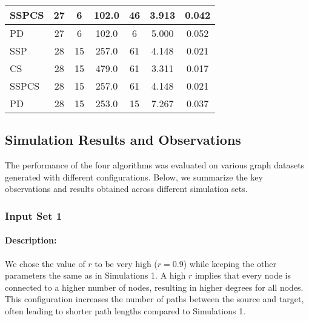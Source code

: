 \documentclass{article}
\begin{document}
\begin{table}[H]
{\begin{tabular}{|l|c|c|c|c|c|c|}
SSPCS              & 27             & 6                 & 102.0                  & 46             & 3.913                     & 0.042                                   \\ \hline
PD                 & 27             & 6                 & 102.0                  & 6              & 5.000                     & 0.052                                   \\ \hline
SSP                & 28             & 15                & 257.0                  & 61             & 4.148                     & 0.021                                   \\ \hline
CS                 & 28             & 15                & 479.0                  & 61             & 3.311                     & 0.017                                   \\ \hline
SSPCS              & 28             & 15                & 257.0                  & 61             & 4.148                     & 0.021                                   \\ \hline
PD                 & 28             & 15                & 253.0                  & 15             & 7.267                     & 0.037                                   \\ \hline
\end{tabular}%
}
\label{tab:simulation2_set5_algorithm_metrics}
\end{table}

\subsection{Simulation Results and Observations}

The performance of the four algorithms was evaluated on various graph datasets generated with different configurations. Below, we summarize the key observations and results obtained across different simulation sets.

\subsubsection{Input Set 1}
\paragraph{Description:}
We chose the value of \( r \) to be very high (\( r = 0.9 \)) while keeping the other parameters the same as in Simulations 1. A high \( r \) implies that every node is connected to a higher number of nodes, resulting in higher degrees for all nodes. This configuration increases the number of paths between the source and target, often leading to shorter path lengths compared to Simulations 1.
\end{document}
